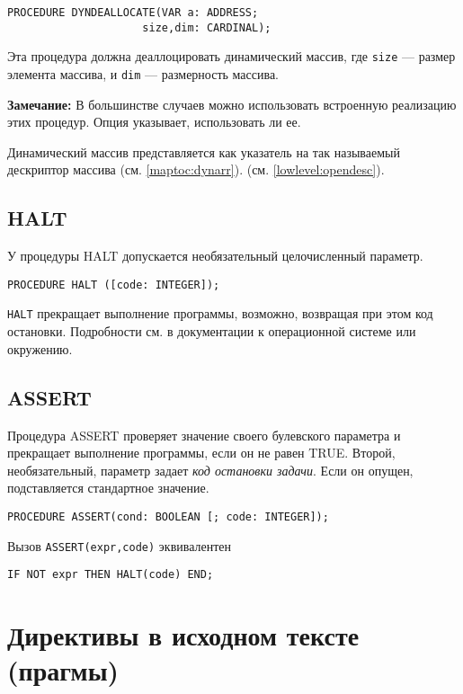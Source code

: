 \begin{verbatim}
PROCEDURE DYNDEALLOCATE(VAR a: ADDRESS;
                     size,dim: CARDINAL);
\end{verbatim}

Эта процедура должна деаллоцировать динамический массив, где
\verb|size| --- размер элемента массива, и
\verb|dim| --- размерность массива.

{\bf Замечание:} В большинстве случаев можно использовать встроенную
реализацию этих процедур.
Опция  указывает,  использовать ли ее.

Динамический массив представляется как указатель на так называемый
дескриптор массива
\ifgenc (см. \ref{maptoc:dynarr}). \fi
\ifgencode (см. \ref{lowlevel:opendesc}). \fi

\subsection{HALT}\label{m2:ext:HALT}
\mextonly

У процедуры HALT допускается необязательный целочисленный параметр.
\begin{verbatim}
PROCEDURE HALT ([code: INTEGER]);
\end{verbatim}
\verb|HALT| прекращает выполнение программы, возможно, возвращая при
этом код остановки. Подробности см. в документации к операционной
системе или окружению.

\subsection{ASSERT}\label{m2:ext:ASSERT}
\mextonly

Процедура ASSERT проверяет значение своего булевского параметра
и прекращает выполнение программы, если он не равен
TRUE. Второй, необязательный, параметр задает
{\em код остановки задачи}. Если он опущен, подставляется стандартное
значение.

\begin{verbatim}
PROCEDURE ASSERT(cond: BOOLEAN [; code: INTEGER]);
\end{verbatim}

Вызов \verb|ASSERT(expr,code)| эквивалентен
\begin{verbatim}
IF NOT expr THEN HALT(code) END;
\end{verbatim}

\section{Директивы в исходном тексте (прагмы)}\label{m2:pragmas}

